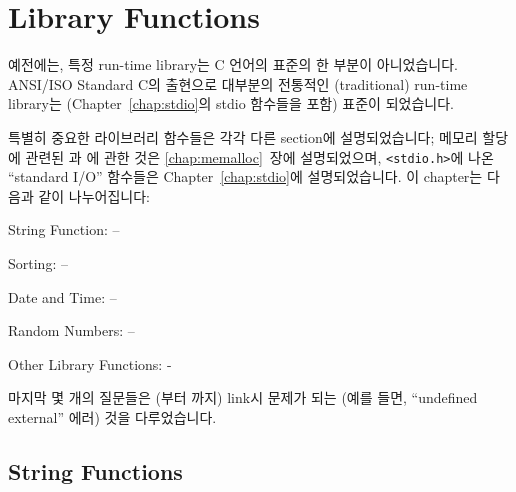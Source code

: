 \chapter{Library Functions}	\label{chap:libfunc}

예전에는, 특정 run-time library는 C 언어의 표준의 한 부분이 아니었습니다.
ANSI/ISO Standard C의 출현으로 대부분의 전통적인 (traditional) run-time
library는 (Chapter~\ref{chap:stdio}의 stdio 함수들을 포함) 표준이 되었습니다.

특별히 중요한 라이브러리 함수들은 각각 다른 section에 설명되었습니다; 메모리
할당에 관련된 과 에 관한 것은 \ref{chap:memalloc}~장에
설명되었으며, \verb+<stdio.h>+에 나온 ``standard I/O'' 함수들은
Chapter~\ref{chap:stdio}에 설명되었습니다.
이 chapter는 다음과 같이 나누어집니다:

\begin{description}
\item String Function: --
\item Sorting: --
\item Date and Time: --
\item Random Numbers: --
\item Other Library Functions: -
\end{description}

마지막 몇 개의 질문들은 (부터 까지) link시 문제가 되는 
(예를 들면, ``undefined external'' 에러) 것을 다루었습니다.

\section{String Functions}

